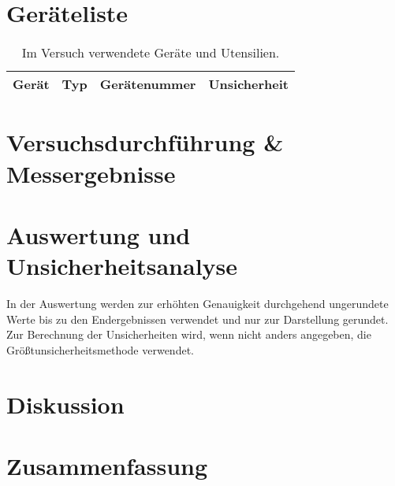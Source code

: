 \documentclass[12pt,a4paper,twoside]{article}
\begin{document}
\section{Geräteliste} %

    \begin{table}[H]
        \centering
        \caption{Im Versuch verwendete Geräte und Utensilien.}
        \label{tab:geraete}
        \begin{tabular}{| l | l | l | l |}
            \hline
            Gerät   & Typ   & Gerätenummer  & Unsicherheit \\
            \hline
        \end{tabular}
    \end{table}


\section{Versuchsdurchführung \& Messergebnisse} %


\section{Auswertung und Unsicherheitsanalyse} %

In der Auswertung werden zur erhöhten Genauigkeit durchgehend ungerundete Werte bis zu den Endergebnissen verwendet und nur zur Darstellung gerundet. \\
Zur Berechnung der Unsicherheiten wird, wenn nicht anders angegeben, die Größtunsicherheitsmethode verwendet.


\section{Diskussion} %


\section{Zusammenfassung} %


\printbibliography[heading=bibintoc]
\end{document}
